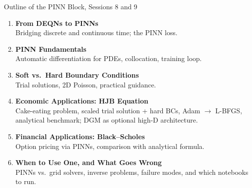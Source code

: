\documentclass[aspectratio=169,11pt]{beamer}
\begin{document}
\begin{frame}{Outline of the PINN Block, Sessions 8 and 9}
\begin{enumerate}
    \item \textbf{From DEQNs to PINNs}\\
    {\small Bridging discrete and continuous time; the PINN loss.}

    \vspace{0.4em}
    \item \textbf{PINN Fundamentals}\\
    {\small Automatic differentiation for PDEs, collocation, training loop.}

    \vspace{0.4em}
    \item \textbf{Soft vs.\ Hard Boundary Conditions}\\
    {\small Trial solutions, 2D Poisson, practical guidance.}

    \vspace{0.4em}
    \item \textbf{Economic Applications: HJB Equation}\\
    {\small Cake-eating problem, scaled trial solution + hard BCs, Adam $\to$ L-BFGS, analytical benchmark; DGM as optional high-D architecture.}

    \vspace{0.4em}
    \item \textbf{Financial Applications: Black--Scholes}\\
    {\small Option pricing via PINNs, comparison with analytical formula.}

    \vspace{0.4em}
    \item \textbf{When to Use One, and What Goes Wrong}\\
    {\small PINNs vs.\ grid solvers, inverse problems, failure modes, and which notebooks to run.}
\end{enumerate}
\end{frame}
\end{document}
